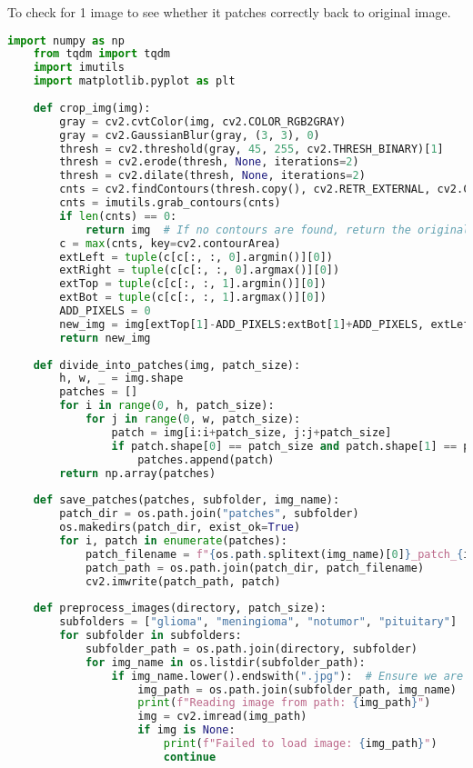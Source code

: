 To check for 1 image to see whether it patches correctly back to original image.
\begin{lstlisting}[language=Python]
    import numpy as np
    from tqdm import tqdm
    import imutils
    import matplotlib.pyplot as plt
    
    def crop_img(img):
        gray = cv2.cvtColor(img, cv2.COLOR_RGB2GRAY)
        gray = cv2.GaussianBlur(gray, (3, 3), 0)
        thresh = cv2.threshold(gray, 45, 255, cv2.THRESH_BINARY)[1]
        thresh = cv2.erode(thresh, None, iterations=2)
        thresh = cv2.dilate(thresh, None, iterations=2)
        cnts = cv2.findContours(thresh.copy(), cv2.RETR_EXTERNAL, cv2.CHAIN_APPROX_SIMPLE)
        cnts = imutils.grab_contours(cnts)
        if len(cnts) == 0:
            return img  # If no contours are found, return the original image
        c = max(cnts, key=cv2.contourArea)
        extLeft = tuple(c[c[:, :, 0].argmin()][0])
        extRight = tuple(c[c[:, :, 0].argmax()][0])
        extTop = tuple(c[c[:, :, 1].argmin()][0])
        extBot = tuple(c[c[:, :, 1].argmax()][0])
        ADD_PIXELS = 0
        new_img = img[extTop[1]-ADD_PIXELS:extBot[1]+ADD_PIXELS, extLeft[0]-ADD_PIXELS:extRight[0]+ADD_PIXELS].copy()
        return new_img
    
    def divide_into_patches(img, patch_size):
        h, w, _ = img.shape
        patches = []
        for i in range(0, h, patch_size):
            for j in range(0, w, patch_size):
                patch = img[i:i+patch_size, j:j+patch_size]
                if patch.shape[0] == patch_size and patch.shape[1] == patch_size:
                    patches.append(patch)
        return np.array(patches)
    
    def save_patches(patches, subfolder, img_name):
        patch_dir = os.path.join("patches", subfolder)
        os.makedirs(patch_dir, exist_ok=True)
        for i, patch in enumerate(patches):
            patch_filename = f"{os.path.splitext(img_name)[0]}_patch_{i}.jpg"
            patch_path = os.path.join(patch_dir, patch_filename)
            cv2.imwrite(patch_path, patch)
    
    def preprocess_images(directory, patch_size):
        subfolders = ["glioma", "meningioma", "notumor", "pituitary"]
        for subfolder in subfolders:
            subfolder_path = os.path.join(directory, subfolder)
            for img_name in os.listdir(subfolder_path):
                if img_name.lower().endswith(".jpg"):  # Ensure we are reading .jpg files
                    img_path = os.path.join(subfolder_path, img_name)
                    print(f"Reading image from path: {img_path}")
                    img = cv2.imread(img_path)
                    if img is None:
                        print(f"Failed to load image: {img_path}")
                        continue
    

\end{lstlisting}

